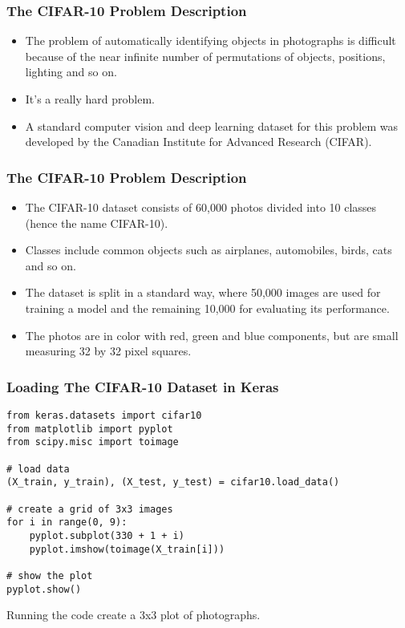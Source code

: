\begin{frame}[fragile] \frametitle{The CIFAR-10 Problem Description}
\begin{itemize}
\item The problem of automatically identifying objects in photographs is difficult because of the near infinite number of permutations of objects, positions, lighting and so on. 
\item It's a really hard problem.
\item  A standard computer vision and deep learning dataset for this problem was developed by the Canadian Institute for Advanced Research (CIFAR).
\end{itemize}
\end{frame}


\begin{frame}[fragile] \frametitle{The CIFAR-10 Problem Description}

\begin{itemize}
\item The CIFAR-10 dataset consists of 60,000 photos divided into 10 classes (hence the name CIFAR-10). 
\item Classes include common objects such as airplanes, automobiles, birds, cats and so on. 
\item The dataset is split in a standard way, where 50,000 images are used for training a model and the remaining 10,000 for evaluating its performance.
\item The photos are in color with red, green and blue components, but are small measuring 32 by 32 pixel squares.
\end{itemize}
\end{frame}


\begin{frame}[fragile] \frametitle{Loading The CIFAR-10 Dataset in Keras}

\begin{lstlisting}
from keras.datasets import cifar10
from matplotlib import pyplot
from scipy.misc import toimage

# load data
(X_train, y_train), (X_test, y_test) = cifar10.load_data()

# create a grid of 3x3 images
for i in range(0, 9):
    pyplot.subplot(330 + 1 + i)
    pyplot.imshow(toimage(X_train[i]))
    
# show the plot
pyplot.show()
\end{lstlisting}
Running the code create a 3x3 plot of photographs.
\end{frame}


